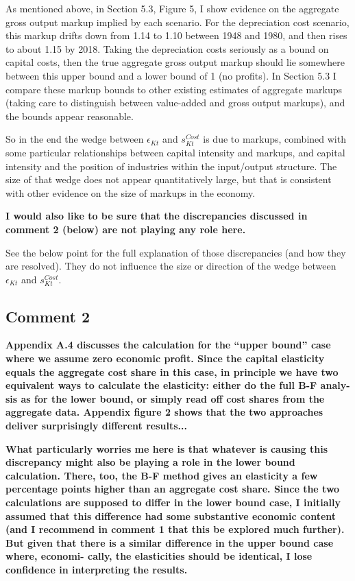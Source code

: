 \documentclass[11pt]{article}
\begin{document}
As mentioned above, in Section 5.3, Figure 5, I show evidence on the aggregate gross output markup implied by each scenario. For the depreciation cost scenario, this markup drifts down from 1.14 to 1.10 between 1948 and 1980, and then rises to about 1.15 by 2018. Taking the depreciation costs seriously as a bound on capital costs, then the true aggregate gross output markup should lie somewhere between this upper bound and a lower bound of 1 (no profits). In Section 5.3 I compare these markup bounds to other existing estimates of aggregate markups (taking care to distinguish between value-added and gross output markups), and the bounds appear reasonable. 

So in the end the wedge between $\epsilon_{Kt}$ and $s_{Kt}^{Cost}$ is due to markups, combined with some particular relationships between capital intensity and markups, and capital intensity and the position of industries within the input/output structure. The size of that wedge does not appear quantitatively large, but that is consistent with other evidence on the size of markups in the economy.

\textbf{I would also like to be sure that the discrepancies discussed in comment 2 (below) are not playing any role here.} 

See the below point for the full explanation of those discrepancies (and how they are resolved). They do not influence the size or direction of the wedge between $\epsilon_{Kt}$ and $s_{Kt}^{Cost}$. 

\subsection*{Comment 2}
\textbf{Appendix A.4 discusses the calculation for the “upper bound” case where we assume zero economic profit. Since the capital elasticity equals the aggregate cost share in this case, in principle we have two equivalent ways to calculate the elasticity: either do the full B-F analy- sis as for the lower bound, or simply read off cost shares from the aggregate data. Appendix figure 2 shows that the two approaches deliver surprisingly different results...}

\textbf{What particularly worries me here is that whatever is causing this discrepancy might also be playing a role in the lower bound calculation. There, too, the B-F method gives an elasticity a few percentage points higher than an aggregate cost share. Since the two calculations are supposed to differ in the lower bound case, I initially assumed that this difference had some substantive economic content (and I recommend in comment 1 that this be explored much further). But given that there is a similar difference in the upper bound case where, economi- cally, the elasticities should be identical, I lose confidence in interpreting the results.}
\end{document}
